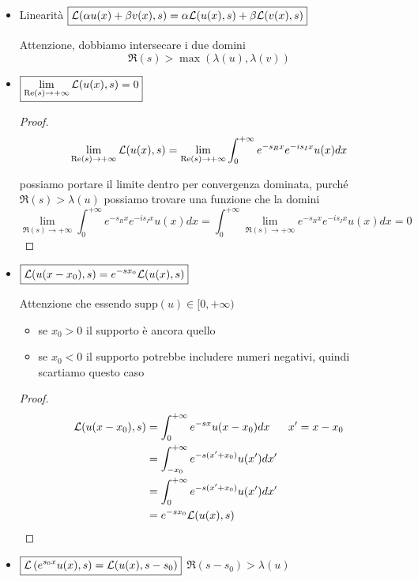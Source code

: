 \begin{itemize}
\item Linearità $\boxed{\mathcal{L}(\alpha u(x) + \beta v(x), s) = \alpha \mathcal{L}(u(x), s) + \beta \mathcal{L}(v(x), s)}$

Attenzione, dobbiamo intersecare i due domini
\begin{equation*}
\boxed{\Re (s) > \max(\lambda (u), \lambda (v))}
\end{equation*}
\item $\boxed{\lim\limits_{\operatorname{Re} (s)\rightarrow + \infty}\mathcal{L}(u(x), s) = 0}$

\begin{proof}
\begin{equation*}
\lim\limits_{\operatorname{Re} (s)\rightarrow + \infty}\mathcal{L}(u(x), s) = \lim\limits_{\operatorname{Re} (s)\rightarrow + \infty}\int^{+ \infty}_{0} e^{- s_{R} x} e^{- is_{I} x} u(x) dx
\end{equation*}

possiamo portare il limite dentro per convergenza dominata, purché $\Re (s) > \lambda (u)$ possiamo trovare una funzione che la domini
\begin{equation*}
\lim\limits_{\Re (s)\rightarrow + \infty}\int^{+ \infty}_{0} e^{- s_{R} x} e^{- is_{I} x} u(x) dx = \int^{+ \infty}_{0}\lim\limits_{\Re (s)\rightarrow + \infty} e^{- s_{R} x} e^{- is_{I} x} u(x) dx = 0
\end{equation*}
\end{proof}
\item $\boxed{\mathcal{L}(u(x - x_{0}), s) = e^{- sx_{0}}\mathcal{L}(u(x), s)}$

Attenzione che essendo $\mathrm{supp}(u) \in [0, + \infty)$
\begin{itemize}
\item se $\boxed{x_{0} > 0}$ il supporto è ancora quello
\item se $x_{0} < 0$ il supporto potrebbe includere numeri negativi, quindi scartiamo questo caso
\end{itemize}

\begin{proof}
\begin{equation*}
\begin{aligned}
\mathcal{L}(u(x - x_{0}), s) & = \int^{+ \infty}_{0} e^{- sx} u(x - x_{0}) dx & x'= x - x_{0}\\
 & = \int^{+ \infty}_{- x_{0}} e^{- s(x' + x_{0})} u(x') dx' & \\
 & = \int^{+ \infty}_{0} e^{- s(x' + x_{0})} u(x') dx' & \\
 & = e^{- sx_{0}}\mathcal{L}(u(x), s) &
\end{aligned}
\end{equation*}
\end{proof}
\item $\boxed{\mathcal{L}\left(e^{s_{0} x} u(x), s\right) = \mathcal{L}(u(x), s - s_{0})}$ $\boxed{\Re (s - s_{0}) > \lambda (u)}$


\end{itemize}
